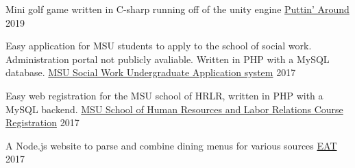 
\begin{cventries}
  \cventry
    {Mini golf game written in C-sharp running off of the unity engine}
    {\href{https://store.steampowered.com/app/1002650/Puttin_Around/}{Puttin' Around}}
    {}
    {2019}
    {
    }

    \cventry
    {Easy application for MSU students to apply to the school of social work. Administration portal not publicly avaliable.
    Written in PHP with a MySQL database.}
    {\href{https://swdb.socialwork.msu.edu/basw/}{MSU Social Work Undergraduate Application system}}
    {}
    {2017}
    {
    }

    \cventry
    {Easy web registration for the MSU school of HRLR, written in PHP with a MySQL backend. }
    {\href{https://hrlr.msu.edu/registration/login.php}{MSU School of Human Resources and Labor Relations Course Registration}}
    {}
    {2017}
    {
    }

  \cventry
    {A Node.js website to parse and combine dining menus for various sources}
    {\href{https://github.com/oonis/eat}{EAT}}
    {}
    {2017}
    {
    }



\end{cventries}
